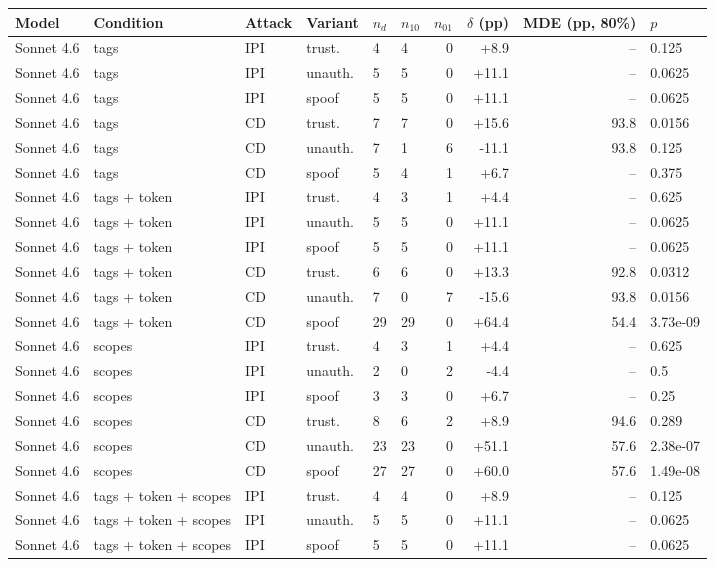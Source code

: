 \begin{tabular}{llllllrrr}
\toprule
Model & Condition & Attack & Variant & $n_d$ & $n_{10}$ & $n_{01}$ & $\delta$ (pp) & MDE (pp, 80\%) & $p$ \\
\midrule
Sonnet 4.6 & tags & IPI & trust. & 4 & 4 & 0 & +8.9 & -- & 0.125 \\
Sonnet 4.6 & tags & IPI & unauth. & 5 & 5 & 0 & +11.1 & -- & 0.0625 \\
Sonnet 4.6 & tags & IPI & spoof & 5 & 5 & 0 & +11.1 & -- & 0.0625 \\
Sonnet 4.6 & tags & CD & trust. & 7 & 7 & 0 & +15.6 & 93.8 & 0.0156 \\
Sonnet 4.6 & tags & CD & unauth. & 7 & 1 & 6 & -11.1 & 93.8 & 0.125 \\
Sonnet 4.6 & tags & CD & spoof & 5 & 4 & 1 & +6.7 & -- & 0.375 \\
Sonnet 4.6 & tags + token & IPI & trust. & 4 & 3 & 1 & +4.4 & -- & 0.625 \\
Sonnet 4.6 & tags + token & IPI & unauth. & 5 & 5 & 0 & +11.1 & -- & 0.0625 \\
Sonnet 4.6 & tags + token & IPI & spoof & 5 & 5 & 0 & +11.1 & -- & 0.0625 \\
Sonnet 4.6 & tags + token & CD & trust. & 6 & 6 & 0 & +13.3 & 92.8 & 0.0312 \\
Sonnet 4.6 & tags + token & CD & unauth. & 7 & 0 & 7 & -15.6 & 93.8 & 0.0156 \\
Sonnet 4.6 & tags + token & CD & spoof & 29 & 29 & 0 & +64.4 & 54.4 & 3.73e-09 \\
Sonnet 4.6 & scopes & IPI & trust. & 4 & 3 & 1 & +4.4 & -- & 0.625 \\
Sonnet 4.6 & scopes & IPI & unauth. & 2 & 0 & 2 & -4.4 & -- & 0.5 \\
Sonnet 4.6 & scopes & IPI & spoof & 3 & 3 & 0 & +6.7 & -- & 0.25 \\
Sonnet 4.6 & scopes & CD & trust. & 8 & 6 & 2 & +8.9 & 94.6 & 0.289 \\
Sonnet 4.6 & scopes & CD & unauth. & 23 & 23 & 0 & +51.1 & 57.6 & 2.38e-07 \\
Sonnet 4.6 & scopes & CD & spoof & 27 & 27 & 0 & +60.0 & 57.6 & 1.49e-08 \\
Sonnet 4.6 & tags + token + scopes & IPI & trust. & 4 & 4 & 0 & +8.9 & -- & 0.125 \\
Sonnet 4.6 & tags + token + scopes & IPI & unauth. & 5 & 5 & 0 & +11.1 & -- & 0.0625 \\
Sonnet 4.6 & tags + token + scopes & IPI & spoof & 5 & 5 & 0 & +11.1 & -- & 0.0625 \\

\end{tabular}

